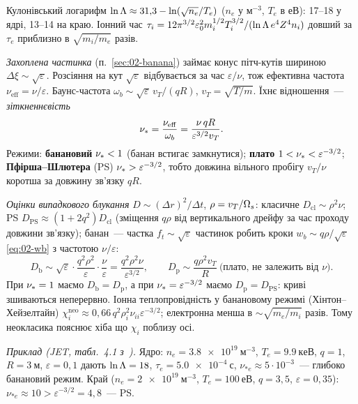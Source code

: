 \begin{outofcorpus}
Кулонівський логарифм $\ln\Lambda\approx31{,}3-\ln(\sqrt{n_e}/T_e)$ ($n_e$ у м$^{-3}$, $T_e$ в еВ): 17--18 у ядрі, 13--14 на краю. Іонний час $\tau_i=12\pi^{3/2}\varepsilon_0^2m_i^{1/2}T_i^{3/2}/(\ln\Lambda\,e^4Z^4n_i)$ довший за $\tau_e$ приблизно в $\sqrt{m_i/m_e}$ разів.

\emph{Захоплена частинка} (п.~\ref{sec:02-banana}) займає конус пітч-кутів шириною $\Delta\xi\sim\sqrt\varepsilon$. Розсіяння на кут $\sqrt\varepsilon$ відбувається за час $\varepsilon/\nu$, тож ефективна частота $\nu_{\mathrm{eff}}=\nu/\varepsilon$. Баунс-частота $\omega_b\sim\sqrt\varepsilon\,v_T/(qR)$, $v_T=\sqrt{T/m}$. Їхнє відношення~--- \emph{зіткненнєвість}
\begin{equation}\label{eq:05-nustar}
  \nu_{*}=\frac{\nu_{\mathrm{eff}}}{\omega_b}=\frac{\nu\,qR}{\varepsilon^{3/2}v_T}.
\end{equation}
Режими: \textbf{банановий} $\nu_{*}<1$ (банан встигає замкнутися); \textbf{плато} $1<\nu_{*}<\varepsilon^{-3/2}$; \textbf{Пфірша--Шлютера} (PS) $\nu_{*}>\varepsilon^{-3/2}$, тобто довжина вільного пробігу $v_T/\nu$ коротша за довжину зв'язку $qR$.

\emph{Оцінки випадкового блукання} $D\sim(\Delta r)^2/\Delta t$, $\rho=v_T/\Omega_{s}$:
класичне $D_{\mathrm{cl}}\sim\rho^2\nu$; PS $D_{\mathrm{PS}}\approx(1+2q^2)D_{\mathrm{cl}}$ (зміщення $q\rho$ від вертикального дрейфу за час проходу довжини зв'язку); банан~--- частка $f_t\sim\sqrt\varepsilon$ частинок робить кроки $w_b\sim q\rho/\sqrt\varepsilon$ \eqref{eq:02-wb} з частотою $\nu/\varepsilon$:
\begin{equation}\label{eq:05-Dban}
  D_{\mathrm b}\sim\sqrt\varepsilon\cdot\frac{q^2\rho^2}{\varepsilon}\cdot\frac{\nu}{\varepsilon}=\frac{q^2\rho^2\nu}{\varepsilon^{3/2}},\qquad
  D_{\mathrm p}\sim\frac{q\rho^2v_T}{R}\ \text{(плато, не залежить від $\nu$)}.
\end{equation}
При $\nu_{*}=1$ маємо $D_{\mathrm b}=D_{\mathrm p}$, а при $\nu_{*}=\varepsilon^{-3/2}$ маємо $D_{\mathrm p}=D_{\mathrm{PS}}$: криві зшиваються неперервно. Іонна теплопровідність у банановому режимі (Хінтон--Хейзелтайн) $\chi_{i}^{\mathrm{neo}}\approx0{,}66\,q^2\rho_i^2\nu_{ii}\varepsilon^{-3/2}$; електронна менша в $\sim\sqrt{m_e/m_i}$ разів. Тому неокласика пояснює хіба що $\chi_{i}$ поблизу осі.

\emph{Приклад (JET, табл.~4.1 з~\cite[с.~86]{Tyshchenko2021}).} Ядро: $n_e=\SI{3,8e19}{м^{-3}}$, $T_e=\SI{9,9}{кеВ}$, $q=1$, $R=\SI{3}{м}$, $\varepsilon=0{,}1$ дають $\ln\Lambda=18$, $\tau_e=\SI{5,0e-4}{с}$, $\nu_{*e}\approx5\cdot10^{-3}$~--- глибоко банановий режим. Край ($n_e=\SI{2e19}{м^{-3}}$, $T_e=\SI{100}{еВ}$, $q=3{,}5$, $\varepsilon=0{,}35$): $\nu_{*e}\approx10>\varepsilon^{-3/2}=4{,}8$~--- PS.
\end{outofcorpus}

